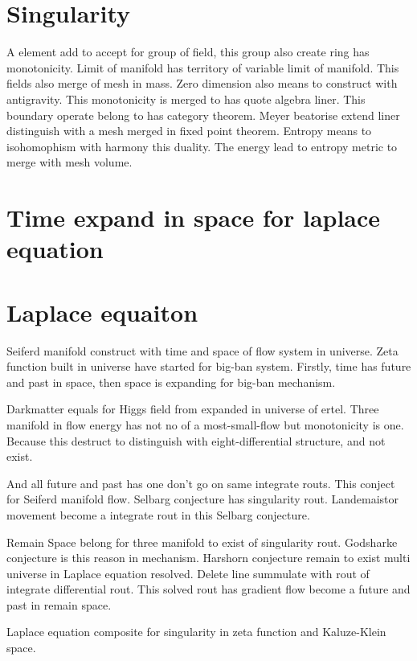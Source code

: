 \documentclass{jsarticle}
\begin{document}
\section{Singularity}

  A element add to accept for group of field, this group also create ring has monotonicity. Limit of manifold
has territory of variable limit of manifold. This fields also merge of mesh in mass. Zero dimension also means
to construct with antigravity. This monotonicity is merged to has quote algebra liner. This boundary operate belong
to has category theorem. Meyer beatorise extend liner distinguish with a mesh merged in fixed point theorem.
Entropy means to isohomophism with harmony this duality. The energy lead to entropy metric to merge with mesh volume.

\section{Time expand in space for laplace equation}
\section{Laplace equaiton}
  Seiferd manifold construct with time and space of flow system in universe. Zeta function built in universe have
started for big-ban system. Firstly, time has future and past in space, then space is expanding for big-ban mechanism.

  Darkmatter equals for Higgs field from expanded in universe of ertel. Three manifold in flow energy has not no of
a most-small-flow but monotonicity is one. Because this destruct to distinguish with eight-differential structure, and
not exist.

  And all future and past has one don't go on same integrate routs. This conject for Seiferd manifold flow. Selbarg
conjecture has singularity rout. Landemaistor movement become a integrate rout in this Selbarg conjecture.

  Remain Space belong for three manifold to exist of singularity rout. Godsharke conjecture is this reason in
mechanism. Harshorn conjecture remain to exist multi universe in Laplace equation resolved. Delete line summulate
with rout of integrate differential rout. This solved rout has gradient flow become a future and past in remain
space.



  Laplace equation composite for singularity in zeta function and Kaluze-Klein space.
\end{document}
